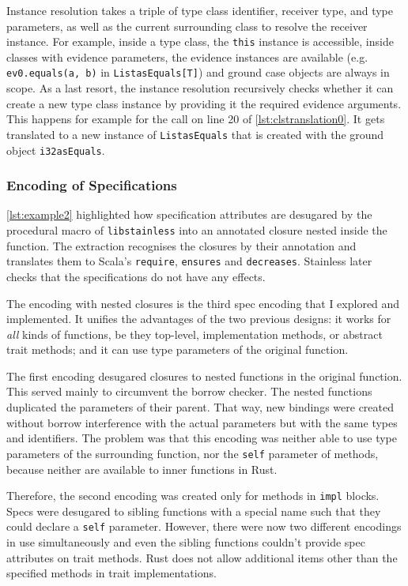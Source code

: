 Instance resolution takes a triple of type class identifier, receiver type, and
type parameters, as well as the current surrounding class to resolve the
receiver instance. For example, inside a type class, the \lstinline!this!
instance is accessible, inside classes with evidence parameters, the evidence
instances are available (e.g. \lstinline!ev0.equals(a, b)! in
\lstinline!ListasEquals[T]!) and ground case objects are always in scope. As a
last resort, the instance resolution recursively checks whether it can create a
new type class instance by providing it the required evidence arguments. This
happens for example for the call on line 20 of \autoref{lst:clstranslation0}. It
gets translated to a new instance of \lstinline!ListasEquals! that is created
with the ground object \lstinline!i32asEquals!.



\subsubsection{Encoding of Specifications}
\label{spec-encoding}

\autoref{lst:example2} highlighted how specification attributes are desugared by
the procedural macro of \lstinline!libstainless! into an annotated closure
nested inside the function. The extraction recognises the closures by their
annotation and translates them to Scala's \lstinline!require!,
\passthrough{\lstinline!ensures!} and \passthrough{\lstinline!decreases!}.
Stainless later checks that the specifications do not have any effects.

The encoding with nested closures is the third spec encoding that I explored and
implemented. It unifies the advantages of the two previous designs: it works for
\emph{all} kinds of functions, be they top-level, implementation methods, or
abstract trait methods; and it can use type parameters of the original function.

The first encoding desugared closures to nested functions in the original
function. This served mainly to circumvent the borrow checker. The nested
functions duplicated the parameters of their parent. That way, new bindings were
created without borrow interference with the actual parameters but with the same
types and identifiers. The problem was that this encoding was neither able to
use type parameters of the surrounding function, nor the \lstinline!self!
parameter of methods, because neither are available to inner functions in Rust.

Therefore, the second encoding was created only for methods in \lstinline!impl!
blocks. Specs were desugared to sibling functions with a special name such that
they could declare a \lstinline!self! parameter. However, there were now two
different encodings in use simultaneously and even the sibling functions
couldn't provide spec attributes on trait methods. Rust does not allow
additional items other than the specified methods in trait implementations.

